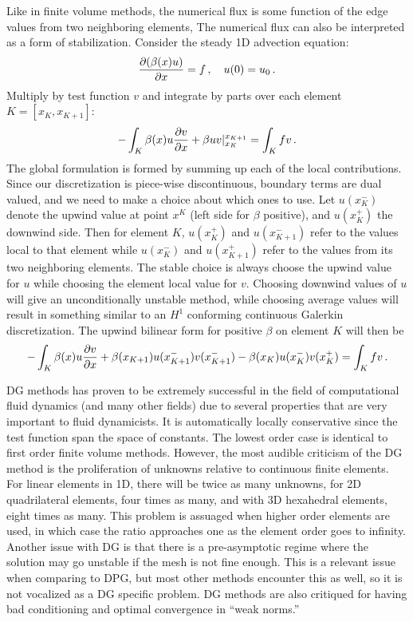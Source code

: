 \documentclass[Proposal.tex]{subfiles}
\begin{document}
Like in finite volume methods, the numerical flux is some function of the edge values from two neighboring elements, 
The numerical flux can also be interpreted as a form of stabilization\cite{DGStabilization}.
Consider the steady 1D advection equation:
\[
\frac{\partial(\beta(x)u)}{\partial x}=f\,,\quad u(0)=u_0\,.
\]
Multiply by test function $v$ and integrate by parts over each element $K=[x_K,x_{K+1}]$:
\[
-\int_K\beta(x)u\frac{\partial v}{\partial x}+\beta uv|_{x_K}^{x_{K+1}}=\int_K fv\,.
\]
The global formulation is formed by summing up each of the local contributions.
Since our discretization is piece-wise discontinuous, boundary terms are dual valued, and we need
to make a choice about which ones to use.
Let $u(x_K^-)$ denote the upwind value at point $x^K$ (left side for $\beta$ positive), and $u(x_K^+)$ the downwind side.
Then for element $K$, $u(x_K^+)$ and $u(x_{K+1}^-)$ refer to the values local to that element while $u(x_K^-)$ and $u(x_{K+1}^+)$ refer to the 
values from its two neighboring elements.
The stable choice is always choose the upwind value for $u$ while choosing the element local value for $v$.
Choosing downwind values of $u$ will give an unconditionally unstable method, while choosing average values will result in something similar
to an $H^1$ conforming continuous Galerkin discretization\cite{DGStabilization}.
The upwind bilinear form for positive $\beta$ on element $K$ will then be
\[
-\int_K\beta(x)u\frac{\partial v}{\partial x}+\beta(x_{K+1})u(x_{K+1}^-)v(x_{K+1}^-)-\beta(x_K)u(x_K^-)v(x_K^+)=\int_K fv\,.
\]

DG methods has proven to be extremely successful in the field of computational fluid dynamics (and many other fields) due
to several properties that are very important to fluid dynamicists.
It is automatically locally conservative since the test function span the space of constants.
The lowest order case is identical to first order finite volume methods.
However, the most audible criticism of the DG method is the proliferation of unknowns relative to continuous finite elements.
For linear elements in 1D, there will be twice as many unknowns, for 2D quadrilateral elements, four times as many, and with 3D hexahedral elements, eight
times as many. 
This problem is assuaged when higher order elements are used, in which case the ratio approaches one as the element order goes to infinity.
Another issue with DG is that there is a pre-asymptotic regime where the solution may go unstable if the mesh is not fine enough.
This is a relevant issue when comparing to DPG, but most other methods encounter this as well, so it is not vocalized as a DG specific problem.
DG methods are also critiqued for having bad conditioning and optimal convergence in ``weak norms.''
\end{document}
